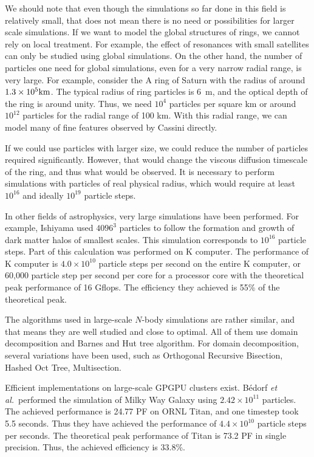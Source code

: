 \documentclass[conference]{IEEEtran}
\begin{document}
We should note that even though the simulations so far done in this
field is relatively small, that does not mean there is no need or
possibilities for larger scale simulations. If we want to model the
global structures of rings, we cannot rely on local treatment. For
example, the effect of resonances with small satellites can only be
studied using global simulations. On the other hand, the number of
particles one need for global simulations, even  for a very narrow
radial range, is very large. For example, consider the A ring of Saturn
with the radius of around $1.3\times 10^5\rm km$. The typical radius
of ring particles is 6~m\cite{ZEBKER1985531}, and the optical depth of
the ring is around unity. Thus, we need $10^4$ particles per square km
or around $10^{12}$ particles for the radial range of 100
km. With this radial range, we can model many of fine features observed
by Cassini directly.

If we could use particles with larger size, we could reduce the number
of particles required significantly. However, that would change the
viscous diffusion timescale of the ring, and thus what would be
observed. It is necessary to perform
simulations with particles of real physical radius, which would require
at least $10^{16}$ and ideally $10^{19}$ particle steps.

In other fields of astrophysics, very large simulations have been
performed. For example, Ishiyama\cite{Ishiyama2014} used $4096^3$
particles to follow the formation and growth of dark matter halos of
smallest scales. This simulation corresponds to  $10^{16}$ particle
steps. Part of this calculation was performed on K computer. The
performance of K computer is $4.0\times 10^{10}$ particle steps per
second on the entire K computer, or 60,000 particle step per second
per core for a processor core with the theoretical peak performance of
16 Gflops\cite{Ishiyamaetal2012}. The efficiency they achieved is 55\%
of the theoretical peak. 


The algorithms used in large-scale $N$-body simulations are rather
similar, and that means they are well studied and close to optimal.
 All of them use domain
decomposition and Barnes and Hut tree algorithm. For domain
decomposition, several variations have been used, such as
Orthogonal Recursive Bisection\cite{Salmon1990}, Hashed Oct
Tree\cite{WarrenSalmon1992}, Multisection\cite{Makino2004}.


Efficient implementations on large-scale GPGPU clusters
exist\cite{Hamadaetal2009, PortegiesZwartetal2014, Bedorfetal2014}.
B{\'e}dorf {\it et al.}\ performed the simulation of Milky Way Galaxy
  using $2.42 \times 10^{11}$ particles. The achieved performance is
  24.77 PF on ORNL Titan, and one timestep took 5.5 seconds. Thus
  they have achieved the performance of $4.4 \times 10^{10}$ particle
  steps per seconds. The theoretical peak performance of Titan is 73.2
  PF in single precision. Thus, the achieved efficiency is 33.8\%.
\end{document}
